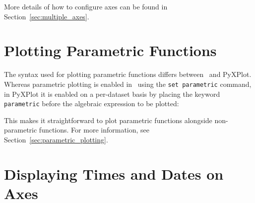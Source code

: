 \noindent More details of how to configure axes can be found in
Section~\ref{sec:multiple_axes}.

\section{Plotting Parametric Functions}

The syntax used for plotting parametric functions differs between \gnuplot\ and
PyXPlot. Whereas parametric plotting is enabled in \gnuplot\ using the {\tt set
parametric} command, in PyXPlot it is enabled on a per-dataset basis by placing
the keyword {\tt parametric} before the algebraic expression to be plotted:

\vspace{3mm}
\newline
{}\newline
{}
\vspace{3mm}\newline
{}\newline
{}
\vspace{3mm}

\noindent This makes it straightforward to plot parametric functions alongside
non-parametric functions. For more information, see
Section~\ref{sec:parametric_plotting}.

\section{Displaying Times and Dates on Axes}

